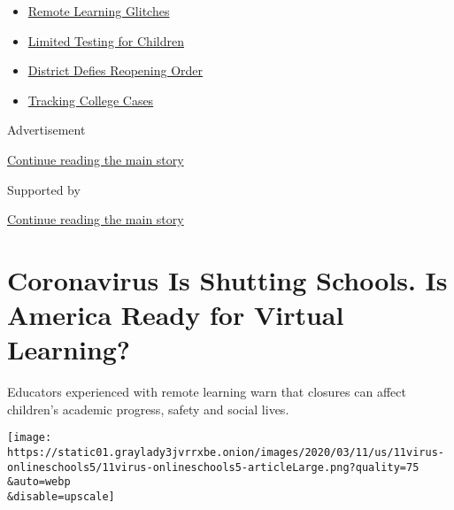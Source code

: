 \begin{itemize}
\tightlist
\item
  \href{https://www.nytimes3xbfgragh.onion/2020/09/08/us/school-districts-cyberattacks-glitches.html?name=styln-coronavirus-schools-reopening\&region=TOP_BANNER\&block=storyline_menu_recirc\&action=click\&pgtype=Article\&impression_id=b7994851-f4b7-11ea-b2ea-e95a284183ee\&variant=undefined}{Remote
  Learning Glitches}
\item
  \href{https://www.nytimes3xbfgragh.onion/2020/09/08/upshot/children-testing-shortfalls-virus.html?name=styln-coronavirus-schools-reopening\&region=TOP_BANNER\&block=storyline_menu_recirc\&action=click\&pgtype=Article\&impression_id=b7994852-f4b7-11ea-b2ea-e95a284183ee\&variant=undefined}{Limited
  Testing for Children}
\item
  \href{https://www.nytimes3xbfgragh.onion/2020/09/10/us/des-moines-school-opening-coronavirus.html?name=styln-coronavirus-schools-reopening\&region=TOP_BANNER\&block=storyline_menu_recirc\&action=click\&pgtype=Article\&impression_id=b7996f60-f4b7-11ea-b2ea-e95a284183ee\&variant=undefined}{District
  Defies Reopening Order}
\item
  \href{https://www.nytimes3xbfgragh.onion/interactive/2020/us/covid-college-cases-tracker.html?name=styln-coronavirus-schools-reopening\&region=TOP_BANNER\&block=storyline_menu_recirc\&action=click\&pgtype=Article\&impression_id=b7996f61-f4b7-11ea-b2ea-e95a284183ee\&variant=undefined}{Tracking
  College Cases}
\end{itemize}

Advertisement

\protect\hyperlink{after-top}{Continue reading the main story}

Supported by

\protect\hyperlink{after-sponsor}{Continue reading the main story}

\hypertarget{coronavirus-is-shutting-schools-is-america-ready-for-virtual-learning}{%
\section{Coronavirus Is Shutting Schools. Is America Ready for Virtual
Learning?}\label{coronavirus-is-shutting-schools-is-america-ready-for-virtual-learning}}

Educators experienced with remote learning warn that closures can affect
children's academic progress, safety and social lives.

\texttt{[image: https://static01.graylady3jvrrxbe.onion/images/2020/03/11/us/11virus-onlineschools5/11virus-onlineschools5-articleLarge.png?quality=75\\\&auto=webp\\\&disable=upscale]}

